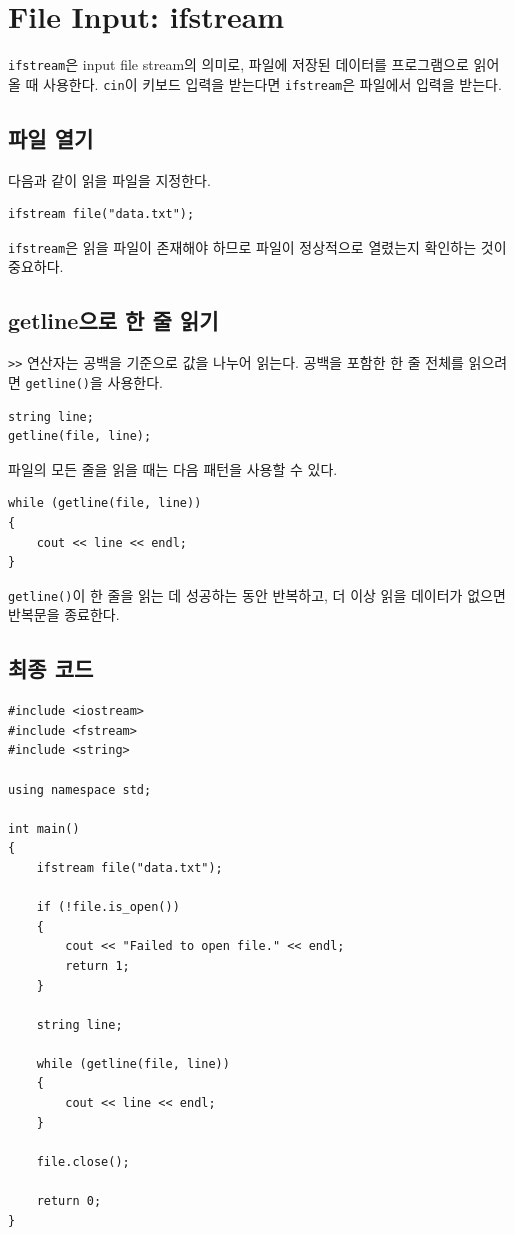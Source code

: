 \documentclass[11pt,a4paper]{article}
\begin{document}
\section{File Input: ifstream}
\texttt{ifstream}은 input file stream의 의미로, 파일에 저장된 데이터를 프로그램으로 읽어올 때 사용한다.
\texttt{cin}이 키보드 입력을 받는다면 \texttt{ifstream}은 파일에서 입력을 받는다.

\subsection{파일 열기}
다음과 같이 읽을 파일을 지정한다.

\begin{lstlisting}
ifstream file("data.txt");
\end{lstlisting}

\texttt{ifstream}은 읽을 파일이 존재해야 하므로 파일이 정상적으로 열렸는지 확인하는 것이 중요하다.

\subsection{getline으로 한 줄 읽기}
\texttt{>>} 연산자는 공백을 기준으로 값을 나누어 읽는다.
공백을 포함한 한 줄 전체를 읽으려면 \texttt{getline()}을 사용한다.

\begin{lstlisting}
string line;
getline(file, line);
\end{lstlisting}

파일의 모든 줄을 읽을 때는 다음 패턴을 사용할 수 있다.

\begin{lstlisting}
while (getline(file, line))
{
    cout << line << endl;
}
\end{lstlisting}

\texttt{getline()}이 한 줄을 읽는 데 성공하는 동안 반복하고,
더 이상 읽을 데이터가 없으면 반복문을 종료한다.

\subsection{최종 코드}
\begin{lstlisting}
#include <iostream>
#include <fstream>
#include <string>

using namespace std;

int main()
{
    ifstream file("data.txt");

    if (!file.is_open())
    {
        cout << "Failed to open file." << endl;
        return 1;
    }

    string line;

    while (getline(file, line))
    {
        cout << line << endl;
    }

    file.close();

    return 0;
}
\end{lstlisting}
\end{document}
